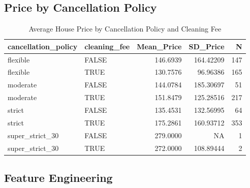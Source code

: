 \documentclass[]{book}
\newenvironment{Shaded}{\begin{snugshade}}{\end{snugshade}}
\newcommand{\KeywordTok}[1]{\textcolor[rgb]{0.13,0.29,0.53}{\textbf{#1}}}
\newcommand{\DataTypeTok}[1]{\textcolor[rgb]{0.13,0.29,0.53}{#1}}
\newcommand{\StringTok}[1]{\textcolor[rgb]{0.31,0.60,0.02}{#1}}
\newcommand{\OperatorTok}[1]{\textcolor[rgb]{0.81,0.36,0.00}{\textbf{#1}}}
\newcommand{\NormalTok}[1]{#1}
\begin{document}
\subsection{Price by Cancellation
Policy}\label{price-by-cancellation-policy}

\begin{Shaded}
\end{Shaded}

\begin{table}

\caption{\label{tab:unnamed-chunk-674}Average House Price by Cancellation Policy and Cleaning Fee}
\centering
\begin{tabular}[t]{l|l|r|r|r}
\hline
cancellation\_policy & cleaning\_fee & Mean\_Price & SD\_Price & N\\
\hline
flexible & FALSE & 146.6939 & 164.42209 & 147\\
\hline
flexible & TRUE & 130.7576 & 96.96386 & 165\\
\hline
moderate & FALSE & 144.0784 & 185.30697 & 51\\
\hline
moderate & TRUE & 151.8479 & 125.28516 & 217\\
\hline
strict & FALSE & 135.4531 & 132.56995 & 64\\
\hline
strict & TRUE & 175.2861 & 160.93712 & 353\\
\hline
super\_strict\_30 & FALSE & 279.0000 & NA & 1\\
\hline
super\_strict\_30 & TRUE & 272.0000 & 108.89444 & 2\\
\hline
\end{tabular}
\end{table}

\subsection{Feature Engineering}\label{feature-engineering}
\end{document}
